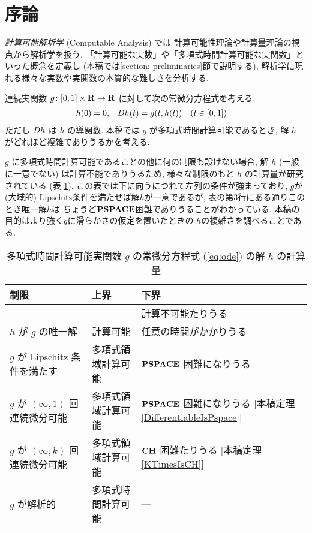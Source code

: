 \section{序論}

\emph{計算可能解析学} (Computable Analysis) \cite{weihrauch00:_comput_analy} では
計算可能性理論や計算量理論の視点から解析学を扱う. 
「計算可能な実数」や「多項式時間計算可能な実関数」といった概念を定義し
(本稿では\ref{section: preliminaries}節で説明する), 
解析学に現れる様々な実数や実関数の本質的な難しさを分析する. 

連続実関数 $g \colon [0,1] \times \mathbf R \to \mathbf R$ に対して次の常微分方程式を考える. 
\begin{align}
 \label{eq:ode}
 h(0) & = 0, &
 D h(t) & = g(t,h(t)) \quad (t \in [0,1])
\end{align}
ただし $D h$ は $h$ の導関数.
本稿では $g$ が多項式時間計算可能であるとき, 
解 $h$ がどれほど複雑でありうるかを考える.

$g$ に多項式時間計算可能であることの他に何の制限も設けない場合, 
解 $h$ (一般に一意でない) は計算不能でありうるため,
様々な制限のもと $h$ の計算量が研究されている (表 \ref{table:related}).
この表では下に向うにつれて左列の条件が強まっており, 
$g$が(大域的) Lipschitz条件を満たせば解$h$が一意であるが, 
表の第3行にある通りこのとき唯一解$h$は
ちょうど$\mathbf{PSPACE}$困難でありうることがわかっている\cite{kawamura2010lipschitz}. 
本稿の目的はより強く$g$に滑らかさの仮定を置いたときの
$h$の複雑さを調べることである. 

\begin{table}
\renewcommand\arraystretch{1.3}
\begin{center}
 \caption{多項式時間計算可能実関数 $g$ の常微分方程式 (\ref{eq:ode}) の解 $h$ の計算量}
 \label{table:related}
 \begin{tabular}{lll}
  制限 & 上界 & 下界 \\
  \hline
   --- & --- & 計算不可能たりうる \cite{pour1979computable} \\
  $h$ が $g$ の唯一解 & 計算可能 \cite{coddington1955theory}
  & 任意の時間がかかりうる \cite{ko1983computational, miller1970recursive} \\
  $g$ が Lipschitz 条件を満たす & 多項式領域計算可能 \cite{ko1983computational}
      &	$\mathbf{PSPACE}$ 困難になりうる \cite{kawamura2010lipschitz}\\
  $g$ が $(\infty, 1)$ 回連続微分可能 & 多項式領域計算可能 & \parbox[t]{14zw}{$\mathbf{PSPACE}$ 困難になりうる\\{}[本稿定理\ref{DifferentiableIsPspace}]} \\
  $g$ が $(\infty, k)$ 回連続微分可能 & 多項式領域計算可能 & \parbox[t]{14zw}{$\mathbf{CH}$ 困難たりうる\\{}[本稿定理\ref{KTimesIsCH}]} \\
  $g$ が解析的 
  & 多項式時間計算可能 \cite{ko1988computing, kawamura2010complexity} 
  & ---
 \end{tabular}
\end{center}
\end{table}

